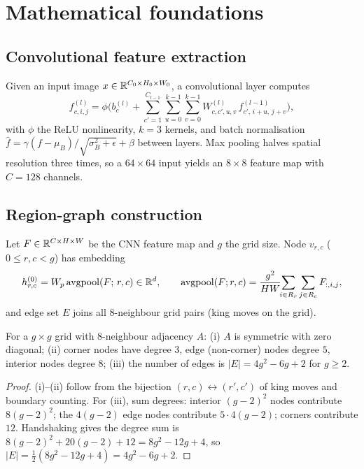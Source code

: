 \section{Mathematical foundations}
\subsection{Convolutional feature extraction}
Given an input image $x \in \mathbb{R}^{C_0 \times H_0 \times W_0}$, a convolutional
layer computes
\begin{equation}
f^{(l)}_{c,i,j} = \phi\!\Big(b^{(l)}_c + \sum_{c'=1}^{C_{l-1}} \sum_{u=0}^{k-1}\sum_{v=0}^{k-1} W^{(l)}_{c,c',u,v}\, f^{(l-1)}_{c',\, i+u,\, j+v}\Big),
\label{eq:conv}
\end{equation}
with $\phi$ the ReLU nonlinearity, $k=3$ kernels, and batch normalisation
$\hat f = \gamma (f-\mu_B)/\sqrt{\sigma_B^2+\epsilon}+\beta$ between layers.
Max pooling halves spatial resolution three times, so a $64\times64$ input
yields an $8\times8$ feature map with $C{=}128$ channels.

\subsection{Region-graph construction}
\begin{definition}
Let $F \in \mathbb{R}^{C \times H \times W}$ be the CNN feature map and $g$ the grid
size. Node $v_{r,c}$ ($0\le r,c<g$) has embedding
\begin{equation}
h^{(0)}_{r,c} = W_p \, \mathrm{avgpool}(F;\, r,c) \in \mathbb{R}^{d},
\qquad \mathrm{avgpool}(F;r,c) = \frac{g^2}{HW}\!\!\sum_{i \in R_r}\sum_{j \in R_c} F_{:,i,j},
\end{equation}
and edge set $E$ joins all 8-neighbour grid pairs (king moves on the grid).
\end{definition}
\begin{proposition}
For a $g\times g$ grid with 8-neighbour adjacency $A$: (i) $A$ is symmetric
with zero diagonal; (ii) corner nodes have degree $3$, edge (non-corner)
nodes degree $5$, interior nodes degree $8$; (iii) the number of edges is
$|E| = 4g^2 - 6g + 2$ for $g \ge 2$.
\end{proposition}
\begin{proof}
(i)--(ii) follow from the bijection $(r,c)\leftrightarrow(r',c')$ of king
moves and boundary counting. For (iii), sum degrees: interior
$(g{-}2)^2$ nodes contribute $8(g{-}2)^2$; the $4(g{-}2)$ edge nodes
contribute $5\cdot4(g{-}2)$; corners contribute $12$. Handshaking gives
the degree sum is $8(g{-}2)^2+20(g{-}2)+12=8g^2-12g+4$, so
$|E|=\tfrac12(8g^2-12g+4)=4g^2-6g+2$.
\end{proof}

